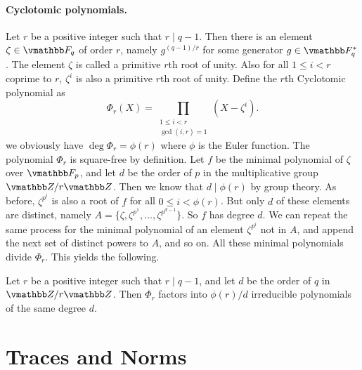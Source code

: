 \paragraph{Cyclotomic polynomials.} Let $r$ be a positive integer such that $r \mid q - 1$. Then 
there is an element $\zeta \in \F_q$ of order $r$, namely $g^{(q - 1) / r}$ for some generator $g 
\in \F_q^*$. The element $\zeta$ is called a primitive $r$th root of unity. Also for all $1 \le i 
< r$ coprime to $r$, $\zeta^i$ is also a primitive $r$th root of unity. Define the $r$th Cyclotomic 
polynomial as
\[ \Phi_r(X) = \prod_{\substack{1 \le i < r \\ \gcd(i, r) = 1}}(X - \zeta^i). \]
we obviously have $\deg \Phi_r = \phi(r)$ where $\phi$ is the Euler function. The polynomial 
$\Phi_r$ is square-free by definition. Let $f$ be the minimal polynomial of $\zeta$ over $\F_p$, 
and let $d$ be the order of $p$ in the multiplicative group $\Z / r\Z$. Then we know that $d \mid
\phi(r)$ by group theory. As before, $\zeta^{p^i}$ is also a root of $f$ for all $0 \le i < 
\phi(r)$. But only $d$ of these elements are distinct, namely $A = \{ \zeta, \zeta^{p^1}, \dots, 
\zeta^{p^{d - 1}} \}$. So $f$ has degree $d$. We can repeat the same process for the minimal 
polynomial of an element $\zeta^{p^i}$ not in $A$, and append the next set of distinct powers to 
$A$, and so on. All these minimal polynomials divide $\Phi_r$. This yields the following.
\begin{result}
	Let $r$ be a positive integer such that $r \mid q - 1$, and let $d$ be the order of $q$ in $\Z 
	/ r\Z$. Then $\Phi_r$ factors into $\phi(r) / d$ irreducible polynomials of the same degree $d$.
\end{result}
 

\section{Traces and Norms}

